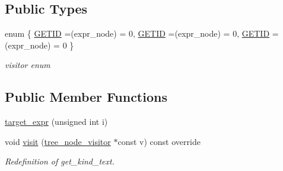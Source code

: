 \subsection*{Public Types}
\begin{DoxyCompactItemize}
\item 
enum \{ \hyperlink{structtarget__expr_a1ceaaf0bbded00c5ed4ad627a31315aca247bc7430e607cf14be1e17c3e997c09}{G\+E\+T\+ID} =(expr\+\_\+node) = 0, 
\hyperlink{structtarget__expr_a1ceaaf0bbded00c5ed4ad627a31315aca247bc7430e607cf14be1e17c3e997c09}{G\+E\+T\+ID} =(expr\+\_\+node) = 0, 
\hyperlink{structtarget__expr_a1ceaaf0bbded00c5ed4ad627a31315aca247bc7430e607cf14be1e17c3e997c09}{G\+E\+T\+ID} =(expr\+\_\+node) = 0
 \}\begin{DoxyCompactList}\small\item\em visitor enum \end{DoxyCompactList}
\end{DoxyCompactItemize}
\subsection*{Public Member Functions}
\begin{DoxyCompactItemize}
\item 
\hyperlink{structtarget__expr_a207afc5e6f0b265a2928ceda90e485ab}{target\+\_\+expr} (unsigned int i)
\item 
void \hyperlink{structtarget__expr_a69a7da18ea0d8b008cec659f2a24b63e}{visit} (\hyperlink{classtree__node__visitor}{tree\+\_\+node\+\_\+visitor} $\ast$const v) const override
\begin{DoxyCompactList}\small\item\em Redefinition of get\+\_\+kind\+\_\+text. \end{DoxyCompactList}\end{DoxyCompactItemize}

